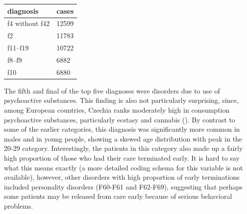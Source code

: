 \documentclass[
]{book}
\newenvironment{Shaded}{\begin{snugshade}}{\end{snugshade}}
\newcommand{\AttributeTok}[1]{\textcolor[rgb]{0.13,0.29,0.53}{#1}}
\newcommand{\ConstantTok}[1]{\textcolor[rgb]{0.56,0.35,0.01}{#1}}
\newcommand{\DecValTok}[1]{\textcolor[rgb]{0.00,0.00,0.81}{#1}}
\newcommand{\FunctionTok}[1]{\textcolor[rgb]{0.13,0.29,0.53}{\textbf{#1}}}
\newcommand{\NormalTok}[1]{#1}
\newcommand{\OtherTok}[1]{\textcolor[rgb]{0.56,0.35,0.01}{#1}}
\newcommand{\SpecialCharTok}[1]{\textcolor[rgb]{0.81,0.36,0.00}{\textbf{#1}}}
\newcommand{\StringTok}[1]{\textcolor[rgb]{0.31,0.60,0.02}{#1}}
\theoremstyle{definition}
\theoremstyle{definition}
\theoremstyle{definition}
\theoremstyle{definition}
\theoremstyle{remark}
\begin{document}
\begin{Shaded}
\end{Shaded}

\begin{tabular}{l|l}
\hline
diagnosis & cases\\
\hline
f4 without f42 & 12599\\
\hline
f2 & 11783\\
\hline
f11–f19 & 10722\\
\hline
f8–f9 & 6882\\
\hline
f10 & 6880\\
\hline
\end{tabular}

The fifth and final of the top five diagnoses were disorders due to use of psychoactive substances. This finding is also not particularly surprising, since, among European countries, Czechia ranks moderately high in consumption psychoactive substances, particularly ecstasy and cannabis (). By contrast to some of the earlier categories, this diagnosis was significantly more common in males and in young people, showing a skewed age distribution with peak in the 20-29 category. Interestingly, the patients in this category also made up a fairly high proportion of those who had their care terminated early. It is hard to say what this means exactly (a more detailed coding schema for this variable is not available), however, other disorders with high proportion of early terminations included personality disorders (F60-F61 and F62-F69), suggesting that perhaps some patients may be released from care early because of serious behavioral problems.
\end{document}
